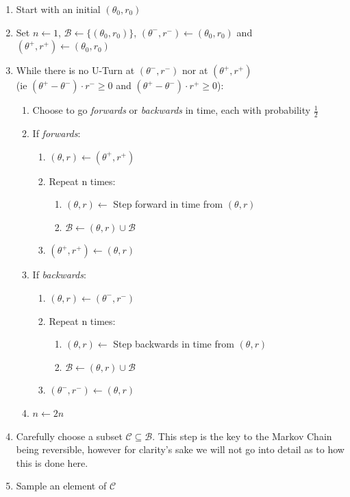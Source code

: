 \begin{enumerate}
    \item Start with an initial $(\theta_0, r_0)$
    \item Set $n\leftarrow1$, $\mathcal{B}\leftarrow \{(\theta_0, r_0)\}$, $(\theta^-, r^-) \leftarrow (\theta_0, r_0) $ and $(\theta^+, r^+) \leftarrow (\theta_0, r_0) $ 
 \item While there is no U-Turn at $(\theta^-, r^-)$ nor at $(\theta^+, r^+)$\\ (ie $(\theta^+ - \theta^-)\cdot r^- \geq 0$ and $(\theta^+ - \theta^-)\cdot r^+ \geq 0$): 
 \begin{enumerate}
 \item Choose to go \textit{forwards} or \textit{backwards} in time, each
with probability $\frac{1}{2}$

\item If \textit{forwards}:
\begin{enumerate}
    \item $(\theta, r) \leftarrow (\theta^+, r^+)$

 \item Repeat n times:
 \begin{enumerate}
     \item $(\theta, r) \leftarrow $ Step forward in time from $(\theta, r)$
     \item $\mathcal{B} \leftarrow (\theta, r) \cup \mathcal{B}$
   \end{enumerate}
   \item $(\theta^+, r^+) \leftarrow (\theta, r)$

    \end{enumerate}
    
\item If \textit{backwards}:
\begin{enumerate}
    \item $(\theta, r) \leftarrow (\theta^-, r^-)$

 \item Repeat n times:
 \begin{enumerate}
     \item $(\theta, r) \leftarrow $ Step backwards in time from $(\theta, r)$
     \item $\mathcal{B} \leftarrow (\theta, r) \cup \mathcal{B}$
   \end{enumerate}
   \item $(\theta^-, r^-) \leftarrow (\theta, r)$
   
    \end{enumerate}
    \item $n \leftarrow 2n$
    \end{enumerate}
\item Carefully choose a subset $\mathcal{C} \subseteq \mathcal{B}$. This step is the key to the Markov Chain being reversible, however for clarity's sake we will not go into detail as to how this is done here.
\item Sample an element of $\mathcal{C}$

    \end{enumerate}



